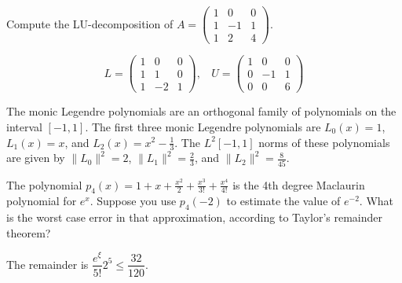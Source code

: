 \documentclass[11pt]{exam}
\begin{document}
\begin{questions}
\question Compute the LU-decomposition of $A = \begin{pmatrix} 1 & 0 & 0 \\ 1 & -1 & 1 \\ 1 & 2 & 4 \end{pmatrix}$. 
\begin{solution}
$$L = \begin{pmatrix} 1 & 0 & 0 \\ 1 & 1 & 0 \\ 1 & -2 & 1\end{pmatrix}, ~~~~ U = \begin{pmatrix} 1 & 0 & 0 \\ 0 & -1 & 1 \\ 0 & 0 & 6\end{pmatrix}$$
\end{solution}
\vfill

\newpage
\question The monic Legendre polynomials are an orthogonal family of polynomials on the interval $[-1,1]$.  The first three monic Legendre polynomials are $L_0(x) = 1$, $L_1(x) = x$, and $L_2(x) = x^2 - \tfrac{1}{3}$. The $L^2[-1,1]$ norms of these polynomials are given by $\|L_0\|^2 = 2$, $\|L_1\|^2 = \tfrac{2}{3}$, and $\|L_2\|^2 = \tfrac{8}{45}$.  

\question The polynomial $p_4(x) = 1 + x + \tfrac{x^2}{2} + \tfrac{x^3}{3!} + \tfrac{x^4}{4!}$ is the 4th degree Maclaurin polynomial for $e^x$.  Suppose you use $p_4(-2)$ to estimate the value of $e^{-2}$.  What is the worst case error in that approximation, according to Taylor's remainder theorem? 
\begin{solution}
The remainder is $\dfrac{e^\xi}{5!} 2^5 \le \dfrac{32}{120}$. 
\end{solution}
\vfill



\end{questions}
\end{document}
